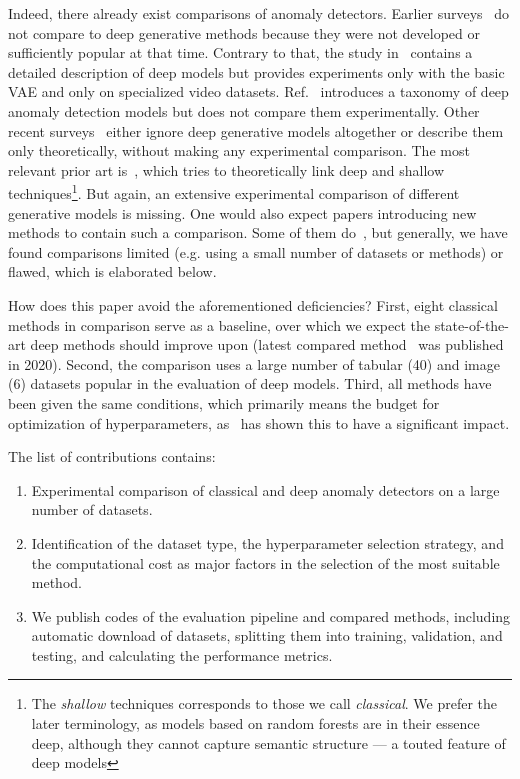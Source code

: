 Indeed, there already exist comparisons of anomaly detectors. Earlier surveys~\cite{pimentel2014review, campos2016evaluation, goldstein2016comparative, pevny2016loda} do not compare to deep generative methods because they were not developed or sufficiently popular at that time. Contrary to that, the study in~\cite{kiran2018overview} contains a detailed description of deep models but provides experiments only with the basic VAE and only on specialized video datasets. Ref.~\cite{chalapathy2019deep} introduces a taxonomy of deep anomaly detection models but does not compare them experimentally. Other recent surveys~\cite{moustafa2019holistic, kwon2019survey, fernandes2019comprehensive, wang2019progress, pang2020deep} either ignore deep generative models altogether or describe them only theoretically, without making any experimental comparison. The most relevant prior art is~\cite{ruff2020unifying}, which tries to theoretically link deep and shallow techniques\footnote{The \textit{shallow} techniques corresponds to those we call \textit{classical}. We prefer the later terminology, as models based on random forests are in their essence deep, although they cannot capture semantic structure --- a touted feature of deep models}. But again, an extensive experimental comparison of different generative models is missing. One would also expect papers introducing new methods to contain such a comparison. Some of them do~\cite{pevny2016loda}, but generally, we have found comparisons limited (e.g. using a small number of datasets or methods) or flawed, which is elaborated below.

How does this paper avoid the aforementioned deficiencies? First, eight classical methods in comparison serve as a baseline, over which we expect the state-of-the-art deep methods should improve upon (latest compared method~\cite{wang2020advae} was published in 2020). Second, the comparison uses a large number of tabular (40) and image (6) datasets popular in the evaluation of deep models. Third, all methods have been given the same conditions, which primarily means the budget for optimization of hyperparameters, as~\cite{vskvara2018generative} has shown this to have a significant impact.

The list of contributions contains:
\begin{enumerate}
    \item Experimental comparison of classical and deep anomaly detectors on a large number of datasets.
    \item Identification of the dataset type, the hyperparameter selection strategy, and the computational cost as major factors in the selection of the most suitable method.
    \item We publish codes of the evaluation pipeline and compared methods, including automatic download of datasets, splitting them into training, validation, and testing, and calculating the performance metrics.
\end{enumerate}

